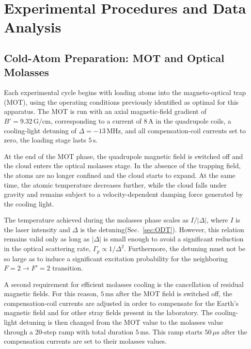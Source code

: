 \section{Experimental Procedures and Data Analysis}

\subsection{Cold-Atom Preparation: MOT and Optical Molasses}

Each experimental cycle begins with loading atoms into the magneto-optical trap (MOT), using the operating conditions previously identified as optimal for this apparatus. The MOT is run with an axial magnetic-field gradient of $B' = 9.32\,\mathrm{G/cm}$, corresponding to a current of $8\,\mathrm{A}$ in the quadrupole coils, a cooling-light detuning of $\Delta = -13\,\mathrm{MHz}$, and all compensation-coil currents set to zero, the loading stage lasts $5\,\mathrm{s}$.

At the end of the MOT phase, the quadrupole magnetic field is switched off and the cloud enters the optical molasses stage. In the absence of the trapping field, the atoms are no longer confined and the cloud starts to expand. At the same time, the atomic temperature decreases further, while the cloud falls under gravity and remains subject to a velocity-dependent damping force generated by the cooling light.

The temperature achieved during the molasses phase scales as $I/|\Delta|$, where $I$ is the laser intensity and $\Delta$ is the detuning(Sec.~\ref{sec:ODT}). However, this relation remains valid only as long as $|\Delta|$ is small enough to avoid a significant reduction in the optical scattering rate, $\Gamma_p \propto 1/\Delta^2$. Furthermore, the detuning must not be so large as to induce a significant excitation probability for the neighboring $F=2 \rightarrow F'=2$ transition.

A second requirement for efficient molasses cooling is the cancellation of residual magnetic fields. For this reason, $5\,\mathrm{ms}$ after the MOT field is switched off, the compensation-coil currents are adjusted in order to compensate for the Earth's magnetic field and for other stray fields present in the laboratory. The cooling-light detuning is then changed from the MOT value to the molasses value through a 20-step ramp with total duration $5\,\mathrm{ms}$. This ramp starts $50\,\mu\mathrm{s}$ after the compensation currents are set to their molasses values.

